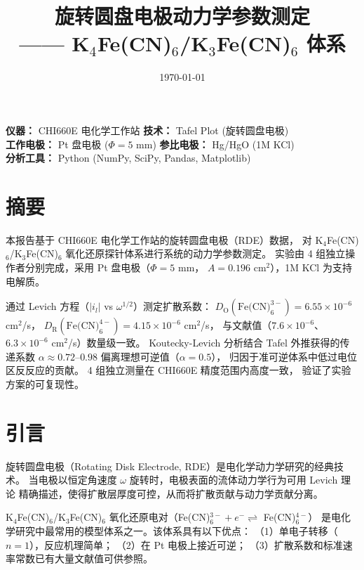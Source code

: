 \documentclass[12pt,a4paper]{ctexart}
\title{\textbf{旋转圆盘电极动力学参数测定\\—— K$_4$Fe(CN)$_6$/K$_3$Fe(CN)$_6$ 体系}}
\author{}
\date{\today}
\begin{document}
\maketitle
\thispagestyle{empty}

\begin{center}
\small
\vspace{1cm}
\textbf{仪器：} CHI660E 电化学工作站 \quad
\textbf{技术：} Tafel Plot (旋转圆盘电极) \\
\textbf{工作电极：} Pt 盘电极 ($\Phi = 5$ mm) \quad
\textbf{参比电极：} Hg/HgO (1M KCl) \\
\textbf{分析工具：} Python (NumPy, SciPy, Pandas, Matplotlib)
\end{center}

\vspace{1.5cm}
\tableofcontents
\newpage

\section{摘要}

本报告基于 CHI660E 电化学工作站的旋转圆盘电极（RDE）数据，
对 K$_4$Fe(CN)$_6$/K$_3$Fe(CN)$_6$ 氧化还原探针体系进行系统的动力学参数测定。
实验由 4 组独立操作者分别完成，采用 Pt 盘电极（$\Phi = 5$ mm，
$A = 0.196$ cm$^2$），1M KCl 为支持电解质。

通过 Levich 方程（$|i_l|$ vs $\omega^{1/2}$）测定扩散系数：
$D_{\text{O}}(\text{Fe(CN)}_6^{3-}) = 6.55 \times 10^{-6}$ cm$^2$/s，
$D_{\text{R}}(\text{Fe(CN)}_6^{4-}) = 4.15 \times 10^{-6}$ cm$^2$/s，
与文献值（$7.6\times 10^{-6}$、$6.3\times 10^{-6}$ cm$^2$/s）数量级一致。
Koutecky-Levich 分析结合 Tafel 外推获得的传递系数
$\alpha \approx 0.72$--$0.98$ 偏离理想可逆值（$\alpha = 0.5$），
归因于准可逆体系中低过电位区反反应的贡献。
4 组独立测量在 CHI660E 精度范围内高度一致，
验证了实验方案的可复现性。

\newpage

\section{引言}

旋转圆盘电极（Rotating Disk Electrode, RDE）是电化学动力学研究的经典技术。
当电极以恒定角速度 $\omega$ 旋转时，电极表面的流体动力学行为可用 Levich 理论
精确描述\cite{bard2001}，使得扩散层厚度可控，从而将扩散贡献与动力学贡献分离。

K$_4$Fe(CN)$_6$/K$_3$Fe(CN)$_6$ 氧化还原电对（Fe(CN)$_6^{3-} + e^- \rightleftharpoons$ Fe(CN)$_6^{4-}$）
是电化学研究中最常用的模型体系之一。该体系具有以下优点：
（1）单电子转移（$n=1$），反应机理简单；
（2）在 Pt 电极上接近可逆；
（3）扩散系数和标准速率常数已有大量文献值可供参照。
\end{document}
